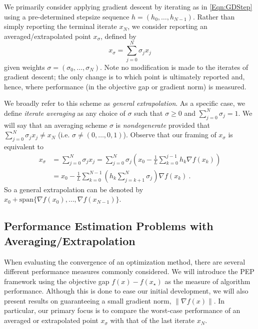 \documentclass[11pt]{article}
\numberwithin{equation}{section}
\theoremstyle{definition}
\theoremstyle{definition}
\theoremstyle{definition}
\newcommand{\1}{\mathbf{1}}
\newcommand{\xStar}{x_\star}
\newcommand{\xSpecial}{x_\sigma}
\begin{document}
We primarily consider applying gradient descent by iterating as in \eqref{Eqn:GDStep} using a pre-determined stepsize sequence $h=(h_0,\dots,h_{N-1})$.
Rather than simply reporting the terminal iterate $x_N$, we consider reporting an averaged/extrapolated point $\xSpecial$, defined by
\begin{equation}\label{Eqn:xSpecialDef}
    \xSpecial = \sum_{j=0}^{N} \sigma_j x_j
\end{equation}
given weights $\sigma = (\sigma_0, \dots, \sigma_N)$. Note no modification is made to the iterates of gradient descent; the only change is to which point is ultimately reported and, hence, where performance (in the objective gap or gradient norm) is measured.

We broadly refer to this scheme as \textit{general extrapolation}. As a specific case, we define \textit{iterate averaging} as any choice of $\sigma$ such that $\sigma \geq 0$ and $\sum_{j=0}^N \sigma_j = 1$. We will say that an averaging scheme $\sigma$ is \textit{nondegenerate} provided that $\sum_{j=0}^N \sigma_j x_j \neq x_N$ (i.e. $\sigma \neq (0,\dots,0,1)$). Observe that our framing of $\xSpecial$ is equivalent to 
\begin{align}\label{Eqn:xSpecialGradForm}
    \xSpecial &= \sum_{j=0}^N \sigma_j x_j = \sum_{j=0}^N \sigma_j \left(x_0 - \frac{1}{L} \sum_{k=0}^{j-1} h_k \nabla f(x_k) \right) \\
    &= x_0 - \frac{1}{L} \sum_{k=0}^{N-1} \left(h_k \sum_{j=k+1}^N \sigma_j\right) \nabla f(x_k) \ . \nonumber
\end{align}
So a general extrapolation can be denoted by $x_0 + \text{span} \{ \nabla f(x_0), \dots, \nabla f(x_{N-1}) \}$.

\subsection{Performance Estimation Problems with Averaging/Extrapolation}
When evaluating the convergence of an optimization method, there are several different performance measures commonly considered. We will introduce the PEP framework using the objective gap $f(x) - f(\xStar)$ as the measure of algorithm performance. Although this is done to ease our initial development, we will also present results on guaranteeing a small gradient norm, $\|\nabla f (x)\|$.
In particular, our primary focus is to compare the worst-case performance of an averaged or extrapolated point $\xSpecial$ with that of the last iterate $x_N$.
\end{document}
